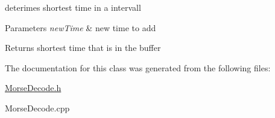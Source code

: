 deterimes shortest time in a intervall 


\begin{DoxyParams}{Parameters}
{\em new\+Time} & new time to add \\
\hline
\end{DoxyParams}
\begin{DoxyReturn}{Returns}
shortest time that is in the buffer 
\end{DoxyReturn}


The documentation for this class was generated from the following files\+:\begin{DoxyCompactItemize}
\item 
\hyperlink{MorseDecode_8h}{Morse\+Decode.\+h}\item 
Morse\+Decode.\+cpp\end{DoxyCompactItemize}
